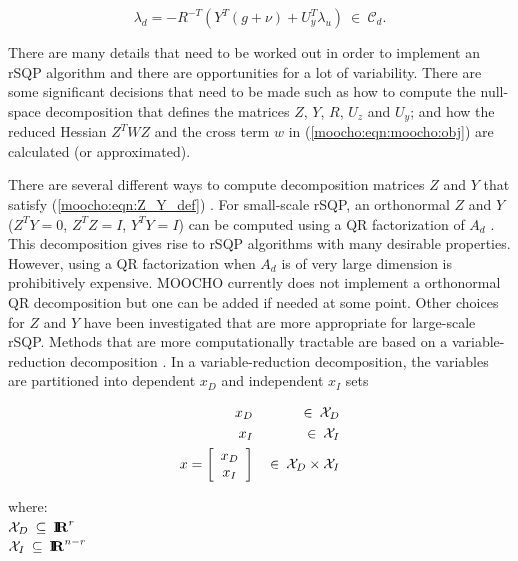 \documentclass[pdf,ps2pdf,11pt]{SANDreport}
\begin{document}
{\bsinglespace
\begin{equation}
\lambda_d = - R^{-T} \left( Y^T(g + \nu) + U_y^T \lambda_u \right)
    \:\in\:\mathcal{C}_d.
\label{moocho:eqn:lambda_d}
\end{equation}
\esinglespace}

There are many details that need to be worked out in order to implement an
rSQP algorithm and there are opportunities for a lot of variability.  There
are some significant decisions that need to be made such as how to compute the
null-space decomposition that defines the matrices $Z$, $Y$, $R$, $U_z$ and
$U_y$; and how the reduced Hessian $Z^T W Z$ and the cross term $w$ in
(\ref{moocho:eqn:moocho:obj}) are calculated (or approximated).

There are several different ways to compute decomposition matrices $Z$ and $Y$
that satisfy (\ref{moocho:eqn:Z_Y_def}) {}\cite{ref:schmid_accel_1993}.  For
small-scale rSQP, an orthonormal $Z$ and $Y$ ($Z^T Y = 0$, $Z^T Z = I$, $Y^T Y
= I$) can be computed using a QR factorization of $A_d$
{}\cite{ref:nocedal_overton_1985}.  This decomposition gives rise to rSQP
algorithms with many desirable properties.  However, using a QR factorization
when $A_d$ is of very large dimension is prohibitively expensive.  MOOCHO
currently does not implement a orthonormal QR decomposition but one can be
added if needed at some point.  Other choices for $Z$ and $Y$ have been
investigated that are more appropriate for large-scale rSQP.  Methods that are
more computationally tractable are based on a variable-reduction decomposition
{}\cite{ref:schmid_accel_1993}.  In a variable-reduction decomposition, the
variables are partitioned into dependent $x_D$ and independent $x_I$ sets

{\bsinglespace
\begin{eqnarray}
x_D & & \:\in\:\mathcal{X}_D \\
x_I & & \:\in\:\mathcal{X}_I \\
x = {\bmat{c} x_D \\ x_I \emat} & & \:\in\: \mathcal{X}_D \times \mathcal{X}_I
\label{moocho:eqn:x_D_I} \\
\end{eqnarray}
\begin{tabbing}
\hspace{4ex}where:\hspace{5ex}\= \\
\>	$\mathcal{X}_D\:\subseteq\:\RE^{r}$\\
\>	$\mathcal{X}_I\:\subseteq\:\RE^{n-r}$
\end{tabbing}
\esinglespace}
\end{document}
